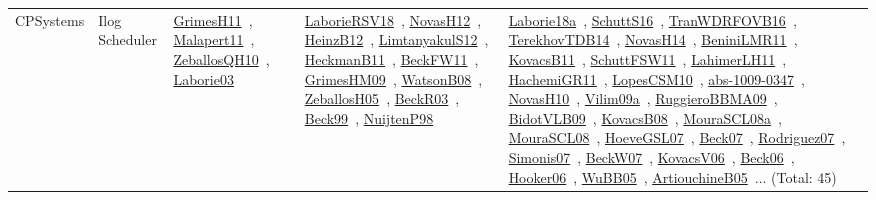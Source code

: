 {\begin{longtable}{lp{3cm}>{\raggedright\arraybackslash}p{6cm}>{\raggedright\arraybackslash}p{6cm}>{\raggedright\arraybackslash}p{8cm}}
CPSystems & Ilog Scheduler & \href{works/GrimesH11.pdf}{GrimesH11}~\cite{GrimesH11}, \href{works/Malapert11.pdf}{Malapert11}~\cite{Malapert11}, \href{works/ZeballosQH10.pdf}{ZeballosQH10}~\cite{ZeballosQH10}, \href{works/Laborie03.pdf}{Laborie03}~\cite{Laborie03} & \href{works/LaborieRSV18.pdf}{LaborieRSV18}~\cite{LaborieRSV18}, \href{works/NovasH12.pdf}{NovasH12}~\cite{NovasH12}, \href{works/HeinzB12.pdf}{HeinzB12}~\cite{HeinzB12}, \href{works/LimtanyakulS12.pdf}{LimtanyakulS12}~\cite{LimtanyakulS12}, \href{works/HeckmanB11.pdf}{HeckmanB11}~\cite{HeckmanB11}, \href{works/BeckFW11.pdf}{BeckFW11}~\cite{BeckFW11}, \href{works/GrimesHM09.pdf}{GrimesHM09}~\cite{GrimesHM09}, \href{works/WatsonB08.pdf}{WatsonB08}~\cite{WatsonB08}, \href{works/ZeballosH05.pdf}{ZeballosH05}~\cite{ZeballosH05}, \href{works/BeckR03.pdf}{BeckR03}~\cite{BeckR03}, \href{works/Beck99.pdf}{Beck99}~\cite{Beck99}, \href{works/NuijtenP98.pdf}{NuijtenP98}~\cite{NuijtenP98} & \href{works/Laborie18a.pdf}{Laborie18a}~\cite{Laborie18a}, \href{works/SchuttS16.pdf}{SchuttS16}~\cite{SchuttS16}, \href{works/TranWDRFOVB16.pdf}{TranWDRFOVB16}~\cite{TranWDRFOVB16}, \href{works/TerekhovTDB14.pdf}{TerekhovTDB14}~\cite{TerekhovTDB14}, \href{works/NovasH14.pdf}{NovasH14}~\cite{NovasH14}, \href{works/BeniniLMR11.pdf}{BeniniLMR11}~\cite{BeniniLMR11}, \href{works/KovacsB11.pdf}{KovacsB11}~\cite{KovacsB11}, \href{works/SchuttFSW11.pdf}{SchuttFSW11}~\cite{SchuttFSW11}, \href{works/LahimerLH11.pdf}{LahimerLH11}~\cite{LahimerLH11}, \href{works/HachemiGR11.pdf}{HachemiGR11}~\cite{HachemiGR11}, \href{works/LopesCSM10.pdf}{LopesCSM10}~\cite{LopesCSM10}, \href{works/abs-1009-0347.pdf}{abs-1009-0347}~\cite{abs-1009-0347}, \href{works/NovasH10.pdf}{NovasH10}~\cite{NovasH10}, \href{works/Vilim09a.pdf}{Vilim09a}~\cite{Vilim09a}, \href{works/RuggieroBBMA09.pdf}{RuggieroBBMA09}~\cite{RuggieroBBMA09}, \href{works/BidotVLB09.pdf}{BidotVLB09}~\cite{BidotVLB09}, \href{works/KovacsB08.pdf}{KovacsB08}~\cite{KovacsB08}, \href{works/MouraSCL08a.pdf}{MouraSCL08a}~\cite{MouraSCL08a}, \href{works/MouraSCL08.pdf}{MouraSCL08}~\cite{MouraSCL08}, \href{works/HoeveGSL07.pdf}{HoeveGSL07}~\cite{HoeveGSL07}, \href{works/Beck07.pdf}{Beck07}~\cite{Beck07}, \href{works/Rodriguez07.pdf}{Rodriguez07}~\cite{Rodriguez07}, \href{works/Simonis07.pdf}{Simonis07}~\cite{Simonis07}, \href{works/BeckW07.pdf}{BeckW07}~\cite{BeckW07}, \href{works/KovacsV06.pdf}{KovacsV06}~\cite{KovacsV06}, \href{works/Beck06.pdf}{Beck06}~\cite{Beck06}, \href{works/Hooker06.pdf}{Hooker06}~\cite{Hooker06}, \href{works/WuBB05.pdf}{WuBB05}~\cite{WuBB05}, \href{works/ArtiouchineB05.pdf}{ArtiouchineB05}~\cite{ArtiouchineB05}... (Total: 45)\\

\end{longtable}}

